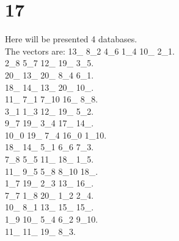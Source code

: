 \chapter{17}
\indent Here will be presented 4 databases.\\
The vectors are:
13\_ 8\_2 4\_6 1\_4 10\_ 2\_1.\\2\_8 5\_7 12\_ 19\_ 3\_5.\\20\_ 13\_ 20\_ 8\_4 6\_1.\\18\_ 14\_ 13\_ 20\_ 10\_.\\11\_ 7\_1 7\_10 16\_ 8\_8.\\3\_1 1\_3 12\_ 19\_ 5\_2.\\9\_7 19\_ 3\_4 17\_ 14\_.\\10\_0 19\_ 7\_4 16\_0 1\_10.\\18\_ 14\_ 5\_1 6\_6 7\_3.\\7\_8 5\_5 11\_ 18\_ 1\_5.\\11\_ 9\_5 5\_8 8\_10 18\_.\\1\_7 19\_ 2\_3 13\_ 16\_.\\7\_7 1\_8 20\_ 1\_2 2\_4.\\10\_ 8\_1 13\_ 15\_ 15\_.\\1\_9 10\_ 5\_4 6\_2 9\_10.\\11\_ 11\_ 19\_ 8\_3.\\